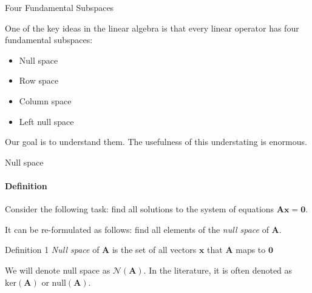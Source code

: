 \documentclass{beamer}
\begin{document}
\begin{frame}{Four Fundamental Subspaces}
\begin{flushleft}

One of the key ideas in the linear algebra is that every linear operator has four fundamental subspaces:

\begin{itemize}
    \item Null space
    \item Row space
    \item Column space
    \item Left null space
\end{itemize}

\bigskip

Our goal is to understand them. The usefulness of this understating is enormous.

\end{flushleft}
\end{frame}

\begin{frame}{Null space}
\framesubtitle{Definition}
\begin{flushleft}

Consider the following task: find all solutions to the system of equations $\mathbf{A} \mathbf{x} = \mathbf{0}$.

\bigskip

It can be re-formulated as follows: find all elements of the \emph{null space} of $\mathbf{A}$.

\begin{block}{Definition 1}
  \emph{Null space} of $\mathbf{A}$ is the set of all vectors $\mathbf{x}$ that $\mathbf{A}$ maps to $\mathbf{0}$
\end{block}

\bigskip

We will denote null space as $\mathcal{N}(\mathbf{A})$. In the literature, it is often denoted as $\text{ker}(\mathbf{A})$ or $\text{null}(\mathbf{A})$.

\end{flushleft}
\end{frame}
\end{document}
